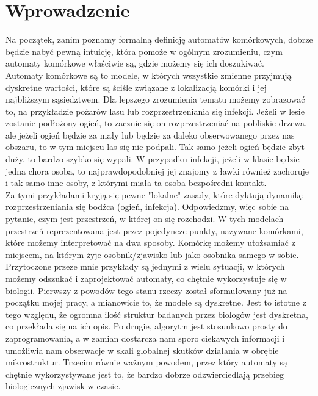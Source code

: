 \documentclass[a4paper,12pt]{article}
\begin{document}
\section{Wprowadzenie}
Na początek, zanim poznamy formalną definicję automatów komórkowych, dobrze będzie nabyć pewną intuicję, która pomoże w ogólnym zrozumieniu, czym automaty komórkowe właściwie są, gdzie możemy się ich doszukiwać. \\
Automaty komórkowe są to modele, w których wszystkie zmienne przyjmują dyskretne wartości, które są ściśle związane z lokalizacją komórki i jej najbliższym sąsiedztwem. Dla lepszego zrozumienia tematu możemy zobrazować to, na przykładzie pożarów lasu lub rozprzestrzeniania się infekcji. Jeżeli w lesie zostanie podłożony ogień, to zacznie się on rozprzestrzeniać na pobliskie drzewa, ale jeżeli ogień będzie za mały lub będzie za daleko obserwowanego przez nas obszaru, to w tym miejscu las się nie podpali. Tak samo jeżeli ogień będzie zbyt duży, to bardzo szybko się wypali. W przypadku infekcji, jeżeli w klasie będzie jedna chora osoba, to najprawdopodobniej jej znajomy z ławki również zachoruje i tak samo inne osoby, z którymi miała ta osoba bezpośredni kontakt. \\
Za tymi przykładami kryją się pewne "lokalne" zasady, które dyktują dynamikę rozprzestrzeniania się bodźca (ogień, infekcja). Odpowiedzmy, więc sobie na pytanie, czym jest przestrzeń, w której on się rozchodzi. W tych modelach przestrzeń reprezentowana jest przez pojedyncze punkty, nazywane komórkami, które możemy interpretować na dwa sposoby. Komórkę możemy utożsamiać z miejscem, na którym żyje osobnik/zjawisko lub jako osobnika samego w sobie. \\
Przytoczone przeze mnie przykłady są jednymi z wielu sytuacji, w których możemy odszukać i zaprojektować automaty, co chętnie wykorzystuje się w biologii. Pierwszy z powodów tego stanu rzeczy został sformułowany już na początku mojej pracy, a mianowicie to, że modele są dyskretne. Jest to istotne z tego względu, że ogromna ilość struktur badanych przez biologów jest dyskretna, co przekłada się na ich opis. Po drugie, algorytm jest stosunkowo prosty do zaprogramowania, a w zamian dostarcza nam sporo ciekawych informacji i umożliwia nam obserwacje w skali globalnej skutków działania w obrębie mikrostruktur. Trzecim równie ważnym powodem, przez który automaty są chętnie wykorzystywane jest to, że bardzo dobrze odzwierciedlają przebieg biologicznych zjawisk w czasie.\\
\end{document}
